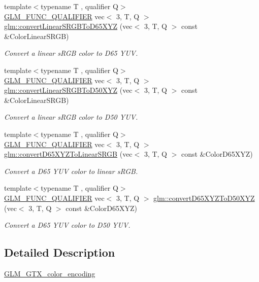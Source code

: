 \begin{DoxyCompactItemize}
\item 
{\footnotesize template$<$typename T , qualifier Q$>$ }\\\mbox{\hyperlink{setup_8hpp_a33fdea6f91c5f834105f7415e2a64407}{G\+L\+M\+\_\+\+F\+U\+N\+C\+\_\+\+Q\+U\+A\+L\+I\+F\+I\+ER}} vec$<$ 3, T, Q $>$ \mbox{\hyperlink{group__gtx__color__encoding_gaf9e130d9d4ccf51cc99317de7449f369}{glm\+::convert\+Linear\+S\+R\+G\+B\+To\+D65\+X\+YZ}} (vec$<$ 3, T, Q $>$ const \&Color\+Linear\+S\+R\+GB)
\begin{DoxyCompactList}\small\item\em Convert a linear s\+R\+GB color to D65 Y\+UV. \end{DoxyCompactList}\item 
{\footnotesize template$<$typename T , qualifier Q$>$ }\\\mbox{\hyperlink{setup_8hpp_a33fdea6f91c5f834105f7415e2a64407}{G\+L\+M\+\_\+\+F\+U\+N\+C\+\_\+\+Q\+U\+A\+L\+I\+F\+I\+ER}} vec$<$ 3, T, Q $>$ \mbox{\hyperlink{group__gtx__color__encoding_ga1522ba180e3d83d554a734056da031f9}{glm\+::convert\+Linear\+S\+R\+G\+B\+To\+D50\+X\+YZ}} (vec$<$ 3, T, Q $>$ const \&Color\+Linear\+S\+R\+GB)
\begin{DoxyCompactList}\small\item\em Convert a linear s\+R\+GB color to D50 Y\+UV. \end{DoxyCompactList}\item 
{\footnotesize template$<$typename T , qualifier Q$>$ }\\\mbox{\hyperlink{setup_8hpp_a33fdea6f91c5f834105f7415e2a64407}{G\+L\+M\+\_\+\+F\+U\+N\+C\+\_\+\+Q\+U\+A\+L\+I\+F\+I\+ER}} vec$<$ 3, T, Q $>$ \mbox{\hyperlink{group__gtx__color__encoding_ga5265386fc3ac29e4c580d37ed470859c}{glm\+::convert\+D65\+X\+Y\+Z\+To\+Linear\+S\+R\+GB}} (vec$<$ 3, T, Q $>$ const \&Color\+D65\+X\+YZ)
\begin{DoxyCompactList}\small\item\em Convert a D65 Y\+UV color to linear s\+R\+GB. \end{DoxyCompactList}\item 
{\footnotesize template$<$typename T , qualifier Q$>$ }\\\mbox{\hyperlink{setup_8hpp_a33fdea6f91c5f834105f7415e2a64407}{G\+L\+M\+\_\+\+F\+U\+N\+C\+\_\+\+Q\+U\+A\+L\+I\+F\+I\+ER}} vec$<$ 3, T, Q $>$ \mbox{\hyperlink{group__gtx__color__encoding_gad12f4f65022b2c80e33fcba2ced0dc48}{glm\+::convert\+D65\+X\+Y\+Z\+To\+D50\+X\+YZ}} (vec$<$ 3, T, Q $>$ const \&Color\+D65\+X\+YZ)
\begin{DoxyCompactList}\small\item\em Convert a D65 Y\+UV color to D50 Y\+UV. \end{DoxyCompactList}\end{DoxyCompactItemize}


\subsection{Detailed Description}
\mbox{\hyperlink{group__gtx__color__encoding}{G\+L\+M\+\_\+\+G\+T\+X\+\_\+color\+\_\+encoding}} 